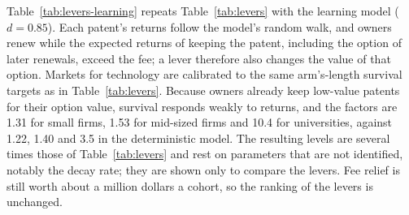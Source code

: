 Table~\ref{tab:levers-learning} repeats Table~\ref{tab:levers} with the learning model ($d=0.85$). Each patent's
returns follow the model's random walk, and owners renew while the expected returns of keeping the patent, including
the option of later renewals, exceed the fee; a lever therefore also changes the value of that option. Markets for
technology are calibrated to the same arm's-length survival targets as in Table~\ref{tab:levers}. Because owners already keep
low-value patents for their option value, survival responds weakly to returns, and the factors are 1.31 for small
firms, 1.53 for mid-sized firms and 10.4 for universities, against 1.22, 1.40 and 3.5 in the deterministic model. The
resulting levels are several times those of Table~\ref{tab:levers} and rest on parameters that are not identified, notably the
decay rate; they are shown only to compare the levers. Fee relief is still worth about a million dollars a cohort,
so the ranking of the levers is unchanged.



